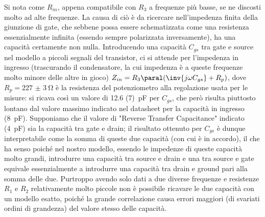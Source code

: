 Si nota come $R_{in}$, appena compatibile con $R_3$ a frequenze più basse, se ne discosti molto ad alte frequenze. La causa di ciò è da ricercare nell'impedenza finita della giunzione di gate, che sebbene possa essere schematizzata come una resistenza essenzialmente infinita (essendo sempre polarizzata inversamente), ha una capacità certamente non nulla. Introducendo una capacità $C_{gs}$ tra gate e source nel modello a piccoli segnali del transistor, ci si attende per l'impedenza in ingresso (trascurando il condensatore, la cui impedenza è a queste frequenze molto minore delle altre in gioco) $Z_{in} = R_3 \paral (\inv{j \omega C_{gs}} + R_p)$, dove $R_p = \SI{227(3)}{\ohm}$ è la resistenza del potenziometro alla regolazione usata per le misure: si ricava così un valore di \SI{12.6 (7)}{\pico\farad} per $C_{gs}$, che però risulta piuttosto lontano dal valore massimo indicato nel datasheet per la capacità in ingresso (\SI{8}{\pico\farad}). Supponiamo che il valore di "Reverse Transfer Capacitance" indicato (\SI{4}{\pico\farad}) sia la capacità tra gate e drain; il risultato ottenuto per $C_{gs}$ è dunque interpretabile come la somma di queste due capacità (con cui è in accordo), il che ha senso poiché nel nostro modello, essendo le impedenze di queste capacità molto grandi, introdurre una capacità tra source e drain e una tra source e gate equivale essenzialmente a introdurre una capacità tra drain e ground pari alla somma delle due. Purtroppo avendo solo dati a due diverse frequenze e resistenze $R_1$ e $R_2$ relativamente molto piccole non è possibile ricavare le due capacità con un modello esatto, poiché la grande correlazione causa errori maggiori (di svariati ordini di grandezza) del valore stesso delle capacità.